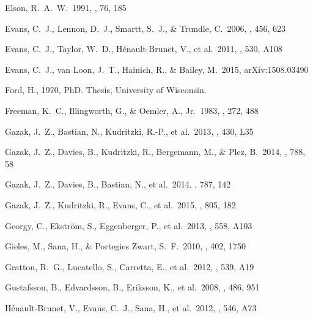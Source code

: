 \documentclass[useAMS,usenatbib]{mn2e}
\begin{document}
\begin{thebibliography}{99}
 Elson, R.~A.~W.\ 1991, \apjs,
76, 185

 Evans, C.~J., Lennon, D.~J., Smartt, S.~J., \& Trundle, C.\ 2006, \aap, 456, 623

 Evans, C.~J., Taylor, W.~D., H{\'e}nault-Brunet, V., et al.\ 2011, \aap, 530, A108

 Evans, C.~J., van Loon,
J.~T., Hainich, R., \& Bailey, M.\ 2015, arXiv:1508.03490

 Ford, H., 1970, PhD. Thesis, University of Wisconsin.

 Freeman, K.~C.,
Illingworth, G., \& Oemler, A., Jr.\ 1983, \apj, 272, 488

 Gazak, J.~Z., Bastian,
N., Kudritzki, R.-P., et al.\ 2013, \mnras, 430, L35

 Gazak, J.~Z., Davies, B.,
Kudritzki, R., Bergemann, M., \& Plez, B.\ 2014, \apj, 788, 58

 Gazak, J.~Z., Davies, B.,
Bastian, N., et al.\ 2014, \apj, 787, 142

 Gazak, J.~Z., Kudritzki,
R., Evans, C., et al.\ 2015, \apj, 805, 182

 Georgy, C., Ekstr{\"o}m, S., Eggenberger, P., et al.\ 2013, \aap, 558, A103

 Gieles, M., Sana, H.,
\& Portegies Zwart, S.~F.\ 2010, \mnras, 402, 1750


 Gratton, R.~G., Lucatello, S., Carretta, E., et al.\ 2012, \aap, 539, A19

 Gustafsson, B., Edvardsson, B., Eriksson, K., et al.\ 2008, \aap, 486, 951

 H{\'e}nault-Brunet, V., Evans, C.~J., Sana, H., et al.\ 2012, \aap, 546, A73


\end{thebibliography}
\end{document}

